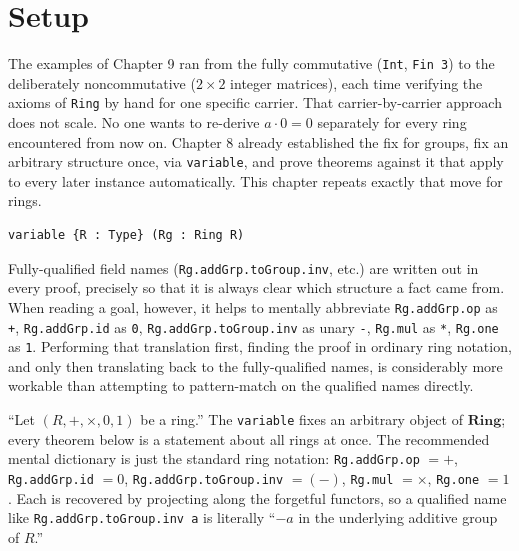 \section{Setup}\label{sec:10-ring-theorems:01-setup:1}

The examples of Chapter 9 ran from the fully commutative (\texttt{Int}, \texttt{Fin 3}) to the deliberately noncommutative (\(2\times 2\) integer matrices), each time verifying the axioms of \texttt{Ring} by hand for one specific carrier. That carrier-by-carrier approach does not scale. No one wants to re-derive \(a\cdot 0=0\) separately for every ring encountered from now on. Chapter 8 already established the fix for groups, fix an arbitrary structure once, via \texttt{variable}, and prove theorems against it that apply to every later instance automatically. This chapter repeats exactly that move for rings.

\begin{lstlisting}
variable {R : Type} (Rg : Ring R)
\end{lstlisting}

Fully-qualified field names (\texttt{Rg.addGrp.toGroup.inv}, etc.) are written out in every proof, precisely so that it is always clear which structure a fact came from. When reading a goal, however, it helps to mentally abbreviate \texttt{Rg.addGrp.op} as \texttt{+}, \texttt{Rg.addGrp.id} as \texttt{0}, \texttt{Rg.addGrp.toGroup.inv} as unary \texttt{-\allowbreak{}}, \texttt{Rg.mul} as \texttt{*}, \texttt{Rg.one} as \texttt{1}. Performing that translation first, finding the proof in ordinary ring notation, and only then translating back to the fully-qualified names, is considerably more workable than attempting to pattern-match on the qualified names directly.

\begin{mathreading}

``Let \((R, +, \times, 0, 1)\) be a ring.'' The \texttt{variable} fixes an arbitrary object of \(\mathbf{Ring}\); every theorem below is a statement about all rings at once. The recommended mental dictionary is just the standard ring notation: \texttt{Rg.addGrp.op} \(= +\), \texttt{Rg.addGrp.id} \(= 0\), \texttt{Rg.addGrp.toGroup.inv} \(= (-)\), \texttt{Rg.mul} \(= \times\), \texttt{Rg.one} \(= 1\). Each is recovered by projecting along the forgetful functors, so a qualified name like \texttt{Rg.addGrp.toGroup.inv a} is literally ``\(-a\) in the underlying additive group of \(R\).''

\end{mathreading}

